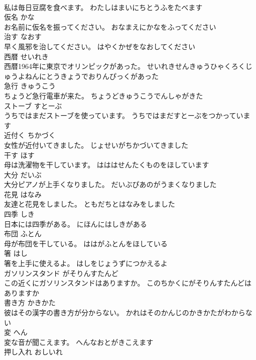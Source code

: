 \documentclass[8pt]{extreport}
\begin{document}
\begin{CJK}{UTF8}{min}
\\	私は毎日豆腐を食べます。	わたしはまいにちとうふをたべます	
\\	仮名	かな	
\\	お名前に仮名を振ってください。	おなまえにかなをふってください	
\\	治す	なおす	
\\	早く風邪を治してください。	はやくかぜをなおしてください	
\\	西暦	せいれき	
\\	西暦1964年に東京でオリンピックがあった。	せいれきせんきゅうひゃくろくじゅうよねんにとうきょうでおりんぴっくがあった	
\\	急行	きゅうこう	
\\	ちょうど急行電車が来た。	ちょうどきゅうこうでんしゃがきた	
\\	ストーブ	すとーぶ	
\\	うちではまだストーブを使っています。	うちではまだすとーぶをつかっています	
\\	近付く	ちかづく	
\\	女性が近付いてきました。	じょせいがちかづいてきました	
\\	干す	ほす	
\\	母は洗濯物を干しています。	はははせんたくものをほしています	
\\	大分	だいぶ	
\\	大分ピアノが上手くなりました。	だいぶぴあのがうまくなりました	
\\	花見	はなみ	
\\	友達と花見をしました。	ともだちとはなみをしました	
\\	四季	しき	
\\	日本には四季がある。	にほんにはしきがある	
\\	布団	ふとん	
\\	母が布団を干している。	ははがふとんをほしている	
\\	箸	はし	
\\	箸を上手に使えるよ。	はしをじょうずにつかえるよ	
\\	ガソリンスタンド	がそりんすたんど	
\\	この近くにガソリンスタンドはありますか。	このちかくにがそりんすたんどはありますか	
\\	書き方	かきかた	
\\	彼はその漢字の書き方が分からない。	かれはそのかんじのかきかたがわからない	
\\	変	へん	
\\	変な音が聞こえます。	へんなおとがきこえます	
\\	押し入れ	おしいれ	

\end{CJK}
\end{document}
